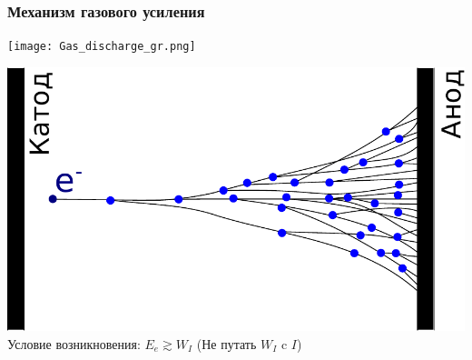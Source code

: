 \documentclass[14pt]{beamer}
\begin{document}
\begin{frame}
\frametitle{Механизм газового усиления}
\begin{minipage}[h]{0.49\linewidth}
	\texttt{[image: Gas\_discharge\_gr.png]}
\end{minipage}
\begin{minipage}[h]{0.49\linewidth}
	\includegraphics[width=1\linewidth]{Electron_avalanche.pdf}
	\newline
	\newline \footnotesize{Условие возникновения: $E_e \gtrsim W_I$}
	\newline (Не путать $W_I$ c $I$)
	
\end{minipage}
\end{frame}
\end{document}
